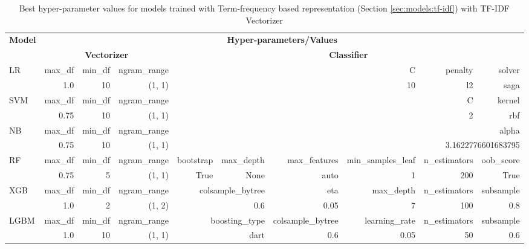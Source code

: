 \begin{landscape}
\begin{table}[!h]
    \centering
    \begin{tabular}{|l|rrr|rrrrrr|}
    \hline
    \multirow{2}{*}{\textbf{Model}} & \multicolumn{9}{c|}{\textbf{Hyper-parameters/Values}} \\
    \cline{2-10}
    & \multicolumn{3}{c|}{\textbf{Vectorizer}} & \multicolumn{6}{c|}{\textbf{Classifier}} \\
    \hline
    \multirow{2}{*}{LR} & max\_df & min\_df & ngram\_range  &  &  &  & C & penalty & solver  \\
                        & 1.0     & 10      & (1, 1)        &  &  &  & 10 & l2      & saga  \\
    \hline
    \multirow{2}{*}{SVM} & max\_df & min\_df & ngram\_range &  &  &  &  & C  & kernel  \\
                         & 0.75    & 10      & (1, 1)       &  &  &  &  & 2  & rbf  \\
    \hline
    \multirow{2}{*}{NB}  & max\_df  & min\_df & ngram\_range &  &  &  &  \multicolumn{3}{r|}{alpha}  \\
                         & 0.75     & 10      & (1, 1)      &  &  &  &  \multicolumn{3}{r|}{3.1622776601683795} \\
    \hline
    \multirow{2}{*}{RF}  & max\_df & min\_df & ngram\_range & bootstrap & max\_depth & max\_features & min\_samples\_leaf & n\_estimators & oob\_score \\
                         & 0.75    & 5       & (1, 1)       & True      & None       & auto          & 1                  & 200           & True       \\
    \hline
    \multirow{2}{*}{XGB}  & max\_df  & min\_df & ngram\_range &  \multicolumn{2}{r}{colsample\_bytree} & eta  & max\_depth & n\_estimators & subsample \\
                          & 1.0      & 2       & (1, 2)       & \multicolumn{2}{r}{0.6}               & 0.05 & 7          & 100           & 0.8 \\
    \hline
    \multirow{2}{*}{LGBM}  & max\_df & min\_df & ngram\_range &  \multicolumn{2}{r}{boosting\_type} & colsample\_bytree & learning\_rate & n\_estimators & subsample   \\
                           & 1.0     & 10      & (1, 1)       &  \multicolumn{2}{r}{dart}           & 0.6               & 0.05           & 50            & 0.6   \\
    \hline
    \end{tabular}
    \caption[Best hyper-parameter values for models trained with Term-frequency based representation (Section \ref{sec:models:tf-idf}) with \texorpdfstring{TF-IDF}{TF-IDF} Vectorizer]{Best hyper-parameter values for models trained with Term-frequency based representation (Section \ref{sec:models:tf-idf}) with \ac{TF-IDF} Vectorizer}
    

\end{table}
\end{landscape}
